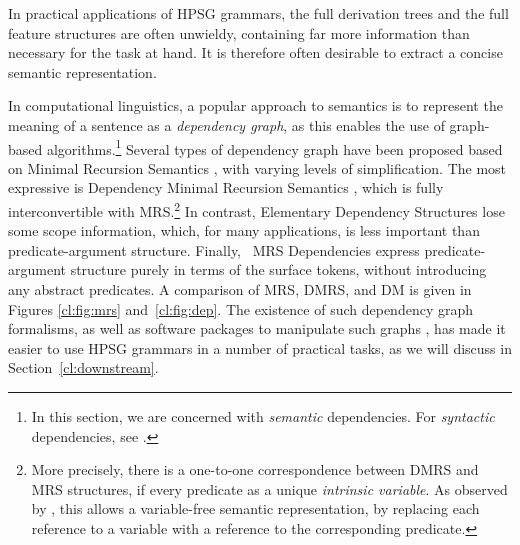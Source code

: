 \documentclass[output=paper,nonflat]{langsci/langscibook}
\begin{document}
In practical applications of HPSG grammars,
the full derivation trees and the full feature structures are often unwieldy,
containing far more information than necessary for the task at hand.
It is therefore often desirable to extract a concise semantic representation.

In computational linguistics,
a popular approach to semantics is to represent the meaning of a sentence as a \textit{dependency graph},
as this enables the use of graph-based algorithms.\footnote{%
	In this section, we are concerned with \emph{semantic} dependencies.
	For \emph{syntactic} dependencies, see .
}
Several types of dependency graph have been proposed
based on Minimal Recursion Semantics \citep[MRS;][]{CFPS2005a},
with varying levels of simplification.
The most expressive is Dependency Minimal Recursion Semantics \citep[DMRS;][]{copestake2009dmrs},
which is fully interconvertible with MRS.\footnote{%
	More precisely, there is a one-to-one correspondence between DMRS and MRS structures,
	if every predicate as a unique \textit{intrinsic variable}.
	As observed by \citet{oepen2006eds}, this allows a variable-free semantic representation,
	by replacing each reference to a variable with a reference to the corresponding predicate.
}
In contrast, Elementary Dependency Structures \citep[EDS;][]{oepen2006eds}
lose some scope information,
which, for many applications, is less important than predicate-argument structure.
Finally, \delphin\ MRS Dependencies \citep[DM;][]{ivanova2012dm}
express predicate-argument structure purely in terms of the surface tokens,
without introducing any abstract predicates.
A comparison of MRS, DMRS, and DM is given in Figures \ref{cl:fig:mrs} and~\ref{cl:fig:dep}.
The existence of such dependency graph formalisms,
as well as software packages to manipulate such graphs \citep{copestake2016pydmrs},
has made it easier to use HPSG grammars in a number of practical tasks,
as we will discuss in Section~\ref{cl:downstream}.






\end{document}
